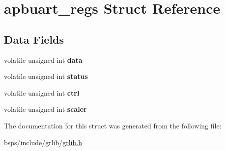 \hypertarget{structapbuart__regs}{}\section{apbuart\+\_\+regs Struct Reference}
\label{structapbuart__regs}
\subsection*{Data Fields}
\begin{DoxyCompactItemize}
\item 
\mbox{\label{structapbuart__regs_a7efbdb3a390d57de8688adf0af2ba919}} 
volatile unsigned int {\bfseries data}
\item 
\mbox{\label{structapbuart__regs_a19cbbb78b9f746f744e6740902644a16}} 
volatile unsigned int {\bfseries status}
\item 
\mbox{\label{structapbuart__regs_ac2756a9763cc6d4057872f1d8d5ab17e}} 
volatile unsigned int {\bfseries ctrl}
\item 
\mbox{\label{structapbuart__regs_a72a6143bd3be4f9a78940ea1af33c21d}} 
volatile unsigned int {\bfseries scaler}
\end{DoxyCompactItemize}


The documentation for this struct was generated from the following file\+:\begin{DoxyCompactItemize}
\item 
bsps/include/grlib/\mbox{\hyperlink{grlib_8h}{grlib.\+h}}\end{DoxyCompactItemize}
